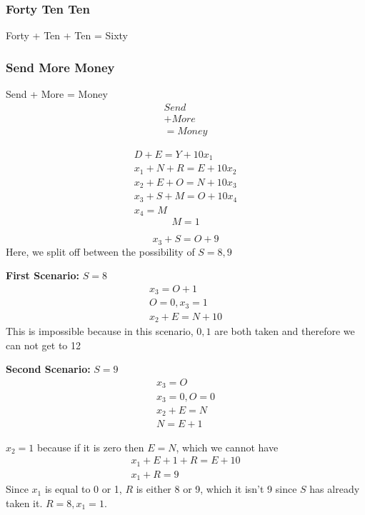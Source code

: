 \documentclass[11pt]{article}
\begin{document}
\subsubsection{Forty Ten Ten}
Forty + Ten + Ten = Sixty
\subsubsection{Send More Money}
Send + More = Money
\begin{gather}
    Send \\
    + More \\
    = Money
\end{gather}

\begin{gather}
    D + E = Y + 10 x_1 \\ 
    x_1 + N + R = E + 10 x_2 \\
    x_2 + E + O = N + 10 x_3 \\
    x_3 + S + M = O + 10 x_4 \\ 
    x_4 = M
\end{gather}
\begin{equation}
    M = 1
\end{equation}

\begin{equation}
    x_3 + S = O + 9
\end{equation}
Here, we split off between the possibility of $S=8,9$

\textbf{First Scenario:} $S=8$
\begin{gather}
    x_3 = O + 1 \\
    O = 0, x_3 = 1 \\
    x_2 + E = N + 10
\end{gather}
This is impossible because in this scenario, $0,1$ are both taken and therefore we can not get to 12

\textbf{Second Scenario:} $S=9$
\begin{gather}
    x_3 = O \\ 
    x_3 = 0, O = 0 \\
    x_2 + E = N \\
    N = E + 1
\end{gather}

$x_2=1$ because if it is zero then $E=N$, which we cannot have
\begin{gather}
    x_1 + E + 1 + R = E + 10 \\
    x_1 + R = 9
\end{gather}
Since $x_1$ is equal to 0 or 1, $R$ is either 8 or 9, which it isn't 9 since $S$ has already taken it.
$R=8, x_1 = 1$.
\end{document}
